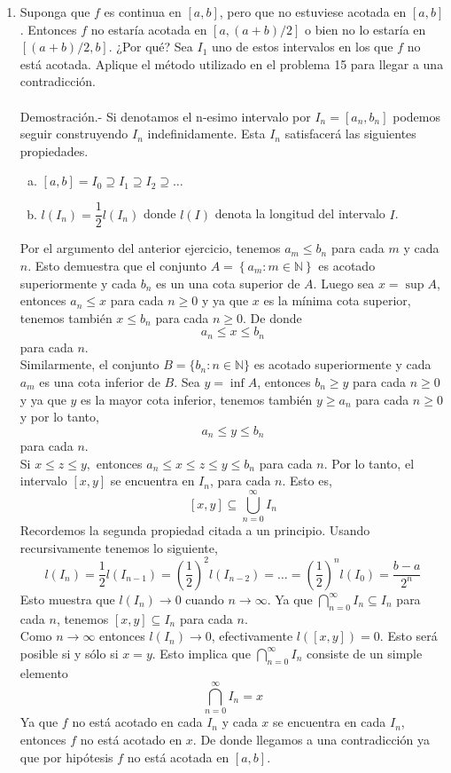 \begin{enumerate}[\bfseries 1.]
    \item Suponga que $f$ es continua en $[a,b]$, pero que no estuviese acotada en $[a,b]$. Entonces $f$ no estaría acotada en $[a,(a+b)/2]$ o bien no lo estaría en $[(a+b)/2,b]$. ¿Por qué? Sea $I_1$ uno de estos intervalos en los que $f$ no está acotada. Aplique el método utilizado en el problema 15 para llegar a una contradicción.\\\\
	Demostración.-\; Si denotamos el n-esimo intervalo por $I_n=[a_n,b_n]$ podemos seguir construyendo $I_n$ indefinidamente. Esta $I_n$ satisfacerá las siguientes propiedades.
	\begin{enumerate}[(a)]
	    \item $[a,b] = I_0 \supseteq I_1 \supseteq I_2 \supseteq \ldots$
	    \item $l(I_n) = \dfrac{1}{2} l(I_n)$ donde $l(I)$ denota la longitud del intervalo $I$.
	\end{enumerate}
	Por el argumento del anterior ejercicio, tenemos $a_m\leq b_n$ para cada $m$ y cada $n$. Esto demuestra que el conjunto $A=\left\{a_m : m\in \mathbb{N}\right\}$ es acotado superiormente y cada $b_n$ es un una cota superior de $A$. Luego sea $x=\sup A$, entonces $a_n\leq x$ para cada $n\geq 0$ y ya que $x$ es la mínima cota superior, tenemos también $x\leq b_n$ para cada $n\geq 0$. De donde 
	$$a_n\leq x \leq b_n$$
	para cada $n$.\\
	Similarmente, el conjunto $B=\lbrace b_n : n\in \mathbb{N} \rbrace$ es acotado superiormente y cada $a_m$ es una cota inferior de $B$. Sea $y=\inf A$, entonces $b_n\geq y$ para cada $n\geq 0$ y ya que $y$ es la mayor cota inferior, tenemos también $y\geq a_n$ para cada $n\geq 0$ y por lo tanto,
	$$a_n\leq y \leq b_n$$
	para cada $n$.\\
	Si $x\leq z \leq y,$ entonces $a_n\leq x \leq z \leq y \leq b_n$ para cada $n$. Por lo tanto, el intervalo $[x,y]$ se encuentra en $I_n$, para cada $n$. Esto es,
	$$[x,y]\subseteq \bigcup_{n=0}^{\infty} I_n$$
	Recordemos la segunda propiedad citada a un principio. Usando recursivamente tenemos lo siguiente,
	$$l(I_n) = \dfrac{1}{2}l \left(I_{n-1}\right) = \left(\dfrac{1}{2}\right)^2 l\left(I_{n-2}\right) = \ldots = \left(\dfrac{1}{2}\right)^nl(I_0) = \dfrac{b-a}{2^n}$$
	Esto muestra que $l(I_n)\to 0$ cuando $n\to \infty$. Ya que $\displaystyle\bigcap_{n=0}^{\infty} I_n \subseteq I_n$ para cada $n$, tenemos $[x,y]\subseteq I_n$ para cada $n$.\\
	Como $n\to \infty$ entonces $l(I_n)\to 0$, efectivamente $l([x,y])=0$. Esto será posible si y sólo si $x=y.$ Esto implica que $\displaystyle\bigcap_{n=0}^\infty I_n$ consiste de un simple elemento
	$$\bigcap_{n=0}^\infty I_n = {x}$$
	Ya que $f$ no está acotado en cada $I_n$ y cada $x$ se encuentra en cada $I_n$, entonces $f$ no está acotado en $x$. De donde llegamos a una contradicción ya que por hipótesis $f$ no está acotada en $[a,b]$.\\\\


\end{enumerate}
